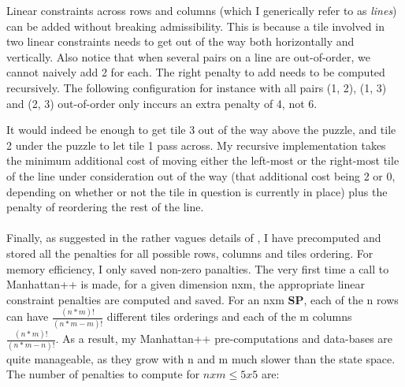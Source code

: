 \begin{itemize}
Linear constraints across rows and columns (which I generically refer to as \textit{lines}) can be added without breaking admissibility. This is because a tile involved in two linear constraints needs to get out of the way both horizontally and vertically. Also notice that when several pairs on a line are out-of-order, we cannot naively add 2 for each. The right penalty to add needs to be computed recursively. The following configuration for instance with all pairs (1, 2), (1, 3) and (2, 3) out-of-order only inccurs an extra penalty of 4, not 6.
\begin{center}
\begin{five}
\end{five}
\end{center}
It would indeed be enough to get tile 3 out of the way above the puzzle, and tile 2 under the puzzle to let tile 1 pass across. My recursive implementation takes the minimum additional cost of moving either the left-most or the right-most tile of the line under consideration out of the way (that additional cost being 2 or 0, depending on whether or not the tile in question is currently in place) plus the penalty of reordering the rest of the line.
\\
\\
Finally, as suggested in the rather vagues details of \cite{SlidingPuzzleLectureNotes}, I have precomputed and stored all the penalties for all possible rows, columns and tiles ordering. For memory efficiency, I only saved non-zero panalties. The very first time a call to Manhattan++ is made, for a given dimension nxm, the appropriate linear constraint penalties are computed and saved. For an nxm \textbf{SP}, each of the n rows can have $\frac{(n * m)!}{(n * m - m)!}$ different tiles orderings and each of the m columns $\frac{(n * m)!}{(n * m - n)!}$. As a result, my Manhattan++ pre-computations and data-bases are quite manageable, as they grow with n and m much slower than the state space. The number of penalties to compute for $nxm \leq 5x5$ are:



\end{itemize}
